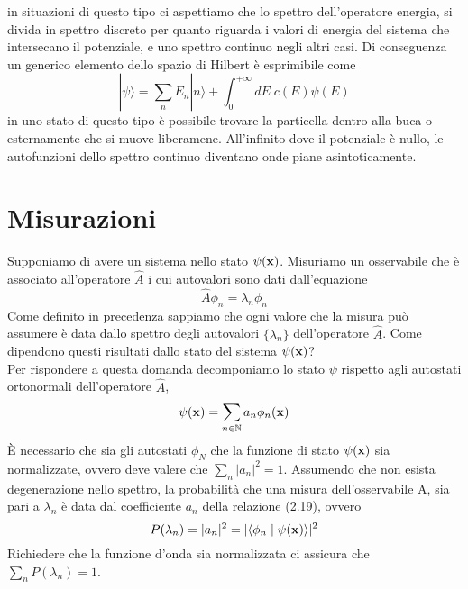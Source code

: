 in situazioni di questo tipo ci aspettiamo che lo spettro dell'operatore energia, si divida in spettro discreto per quanto riguarda i valori di energia del sistema che intersecano il potenziale, e uno spettro continuo negli altri casi. Di conseguenza un generico elemento dello spazio di Hilbert \`e esprimibile come 
\begin{equation*}
	|\psi \rangle = \sum_{n} E_n |n \rangle + \int_{0}^{+\infty} dE \; c(E) \psi(E) 
\end{equation*}
in uno stato di questo tipo \`e possibile trovare la particella dentro alla buca o esternamente che si muove liberamene. All'infinito dove il potenziale \`e nullo, le autofunzioni dello spettro continuo diventano onde piane asintoticamente.

\section{Misurazioni}

Supponiamo di avere un sistema nello stato $\psi(\bold{x})$. Misuriamo un osservabile che \`e associato all'operatore $\hat{A}$ i cui autovalori sono dati dall'equazione 
\begin{equation}
	\hat{A}\phi_n = \lambda_n \phi_n
\end{equation}
Come definito in precedenza sappiamo che ogni valore che la misura pu\`o assumere \`e data dallo spettro degli autovalori $\{\lambda_n\}$ dell'operatore $\hat{A}$. Come dipendono questi risultati dallo stato del sistema $\psi(\bold{x})$?
\\

\noindent Per rispondere a questa domanda decomponiamo lo stato $\psi$ rispetto agli autostati ortonormali dell'operatore $\hat{A}$,
\begin{equation*}
		\psi(\bold{x}) = \sum_{n \in \mathbb{N}}a_n \phi_n(\bold{x})
\end{equation*}
\`E necessario che sia gli autostati $\phi_N$ che la funzione di stato $\psi(\bold{x})$ sia normalizzate, ovvero deve valere che $\sum_{n}|a_n|^2 = 1$. Assumendo che non esista degenerazione nello spettro, la probabilit\`a che una misura dell'osservabile A, sia pari a $\lambda_n$ \`e data dal coefficiente $a_n$ della relazione (2.19), ovvero
\begin{equation}
	P(\lambda_n) = |a_n|^2 = |\langle \phi_n \;|\; \psi(\bold{x})\rangle |^2
\end{equation}
Richiedere che la funzione d'onda sia normalizzata ci assicura che $\sum_{n} P(\lambda_n) = 1$.
\\

